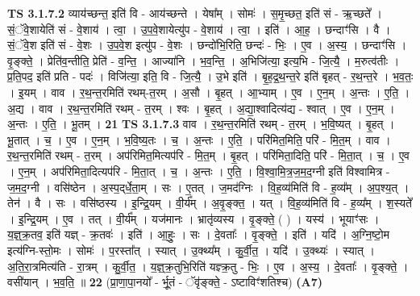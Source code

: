 \documentclass[17pt]{extarticle}
\begin{document}
                  \newline
                                \textbf{ TS 3.1.7.2} \newline
                  व्याय॑च्छन्त॒ इति॑ वि - आय॑च्छन्ते । येषा᳚म् । सोमः॑ । स॒मृ॒च्छत॒ इति॑ सं - ऋ॒च्छते᳚ । सं॒ॅवे॒शायेति॑ सं - वे॒शाय॑ । त्वा॒ । उ॒प॒वे॒शायेत्यु॑प - वे॒शाय॑ । त्वा॒ । इति॑ । आ॒ह॒ । छन्दाꣳ॑सि । वै । सं॒ॅवे॒श इति॑ सं - वे॒शः । उ॒प॒वे॒श इत्यु॑प - वे॒शः । छन्दो॑भि॒रिति॒ छन्दः॑ - भिः॒ । ए॒व । अ॒स्य॒ । छन्दाꣳ॑सि । वृ॒ङ्क्ते॒ । प्रेति॑व॒न्तीति॒ प्रेति॑ - व॒न्ति॒ । आज्या॑नि । भ॒व॒न्ति॒ । अ॒भिजि॑त्या॒ इत्य॒भि - जि॒त्यै॒ । म॒रुत्व॑तीः । प्र॒ति॒पद॒ इति॑ प्रति - पदः॑ । विजि॑त्या॒ इति॒ वि - जि॒त्यै॒ । उ॒भे इति॑ । बृ॒ह॒द्र॒थ॒न्त॒रे इति॑ बृहत् - र॒थ॒न्त॒रे । भ॒व॒तः॒ । इ॒यम् । वाव । र॒थ॒न्त॒रमिति॑ रथम्-त॒रम् । अ॒सौ । बृ॒हत् । आ॒भ्याम् । ए॒व । ए॒न॒म् । अ॒न्तः । ए॒ति॒ । अ॒द्य । वाव । र॒थ॒न्त॒रमिति॑ रथम् - त॒रम् । श्वः । बृ॒हत् । अ॒द्या॒श्वादित्य॑द्य - श्वात् । ए॒व । ए॒न॒म् । अ॒न्तः । ए॒ति॒ । भू॒तम् । \textbf{  21} \newline
                  \newline
                                \textbf{ TS 3.1.7.3} \newline
                  वाव । र॒थ॒न्त॒रमिति॑ रथम् - त॒रम् । भ॒वि॒ष्यत् । बृ॒हत् । भू॒तात् । च॒ । ए॒व । ए॒न॒म् । भ॒वि॒ष्य॒तः । च॒ । अ॒न्तः । ए॒ति॒ । परि॑मित॒मिति॒ परि॑ - मि॒त॒म् । वाव । र॒थ॒न्त॒रमिति॑ रथम् - त॒रम् । अप॑रिमित॒मित्यप॑रि - मि॒त॒म् । बृ॒हत् । परि॑मिता॒दिति॒ परि॑ - मि॒ता॒त् । च॒ । ए॒व । ए॒न॒म् । अप॑रिमिता॒दित्यप॑रि - मि॒ता॒त् । च॒ । अ॒न्तः । ए॒ति॒ । वि॒श्वा॒मि॒त्र॒ज॒म॒द॒ग्नी इति॑ विश्वामित्र - ज॒म॒द॒ग्नी । वसि॑ष्ठेन । अ॒स्प॒द्‌र्धे॒ता॒म् । सः । ए॒तत् । ज॒मद॑ग्निः । वि॒ह॒व्य॑मिति॑ वि - ह॒व्य᳚म् । अ॒प॒श्य॒त् । तेन॑ । वै । सः । वसि॑ष्ठस्य । इ॒न्द्रि॒यम् । वी॒र्य᳚म् । अ॒वृ॒ङ्क्त॒ । यत् । वि॒ह॒व्य॑मिति॑ वि - ह॒व्य᳚म् । श॒स्यते᳚ । इ॒न्द्रि॒यम् । ए॒व । तत् । वी॒र्य᳚म् । यज॑मानः । भ्रातृ॑व्यस्य । वृ॒ङ्क्ते॒ ( ) । यस्य॑ । भूयाꣳ॑सः । य॒ज्ञ्॒क्र॒तव॒ इति॑ यज्ञ् - क्र॒तवः॑ । इति॑ । आ॒हुः॒ । सः । दे॒वताः᳚ । वृ॒ङ्क्ते॒ । इति॑ । यदि॑ । अ॒ग्नि॒ष्टो॒म इत्य॑ग्नि-स्तो॒मः । सोमः॑ । प॒रस्ता᳚त् । स्यात् । उ॒क्थ्य᳚म् । कु॒र्वी॒त॒ । यदि॑ । उ॒क्थ्यः॑ । स्यात् । अ॒ति॒रा॒त्रमित्य॑ति - रा॒त्रम् । कु॒र्वी॒त॒ । य॒ज्ञ्॒क्र॒तुभि॒रिति॑ यज्ञ्क्र॒तु - भिः॒ । ए॒व । अ॒स्य॒ । दे॒वताः᳚ । वृ॒ङ्क्ते॒ । वसी॑यान् । भ॒व॒ति॒ ॥ \textbf{  22 } \newline
                  \newline
                      (प्रा॒णा॒पा॒नयो᳚ - र्भू॒तं - ॅवृ॑ङ्क्ते॒ - ऽष्टाविꣳ॑शतिश्च)  \textbf{(A7)} \newline \newline
\end{document}
